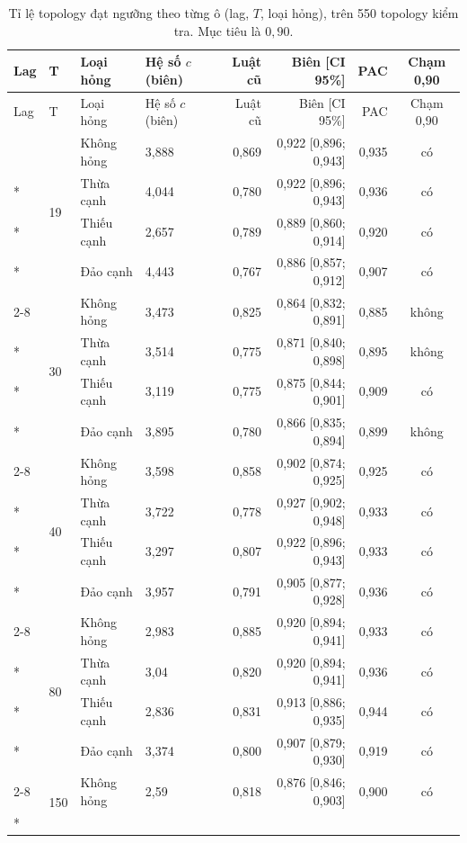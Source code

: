{\small
\begin{longtable}{llllrrrc}
\caption{Tỉ lệ topology đạt ngưỡng theo từng ô (lag, $T$, loại hỏng), trên 550 topology kiểm tra. Mục tiêu là $0{,}90$.}\label{tab:guarantee}\\
\toprule
Lag & T & Loại hỏng & Hệ số $c$ (biên) & Luật cũ & Biên [CI 95\%] & PAC & Chạm 0,90 \\
\midrule
\endfirsthead
\toprule
Lag & T & Loại hỏng & Hệ số $c$ (biên) & Luật cũ & Biên [CI 95\%] & PAC & Chạm 0,90 \\
\midrule
\endhead
\bottomrule
\endfoot
\multirow{20}{*}{1} & \multirow{4}{*}{19} & Không hỏng & 3,888 & 0,869 & 0,922 [0,896; 0,943] & 0,935 & có \\*
 &  & Thừa cạnh & 4,044 & 0,780 & 0,922 [0,896; 0,943] & 0,936 & có \\*
 &  & Thiếu cạnh & 2,657 & 0,789 & 0,889 [0,860; 0,914] & 0,920 & có \\*
 &  & Đảo cạnh & 4,443 & 0,767 & 0,886 [0,857; 0,912] & 0,907 & có \\
\cmidrule(l){2-8}
 & \multirow{4}{*}{30} & Không hỏng & 3,473 & 0,825 & 0,864 [0,832; 0,891] & 0,885 & không \\*
 &  & Thừa cạnh & 3,514 & 0,775 & 0,871 [0,840; 0,898] & 0,895 & không \\*
 &  & Thiếu cạnh & 3,119 & 0,775 & 0,875 [0,844; 0,901] & 0,909 & có \\*
 &  & Đảo cạnh & 3,895 & 0,780 & 0,866 [0,835; 0,894] & 0,899 & không \\
\cmidrule(l){2-8}
 & \multirow{4}{*}{40} & Không hỏng & 3,598 & 0,858 & 0,902 [0,874; 0,925] & 0,925 & có \\*
 &  & Thừa cạnh & 3,722 & 0,778 & 0,927 [0,902; 0,948] & 0,933 & có \\*
 &  & Thiếu cạnh & 3,297 & 0,807 & 0,922 [0,896; 0,943] & 0,933 & có \\*
 &  & Đảo cạnh & 3,957 & 0,791 & 0,905 [0,877; 0,928] & 0,936 & có \\
\cmidrule(l){2-8}
 & \multirow{4}{*}{80} & Không hỏng & 2,983 & 0,885 & 0,920 [0,894; 0,941] & 0,933 & có \\*
 &  & Thừa cạnh & 3,04 & 0,820 & 0,920 [0,894; 0,941] & 0,936 & có \\*
 &  & Thiếu cạnh & 2,836 & 0,831 & 0,913 [0,886; 0,935] & 0,944 & có \\*
 &  & Đảo cạnh & 3,374 & 0,800 & 0,907 [0,879; 0,930] & 0,919 & có \\
\cmidrule(l){2-8}
 & \multirow{4}{*}{150} & Không hỏng & 2,59 & 0,818 & 0,876 [0,846; 0,903] & 0,900 & có \\*

\end{longtable}}
